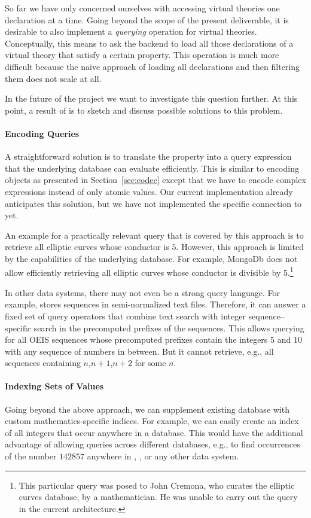 So far we have only concerned ourselves with accessing virtual theories one declaration at a time.
Going beyond the scope of the present deliverable, it is desirable to also implement a \emph{querying} operation for virtual theories.
Conceptually, this means to ask the \MMT backend to load all those declarations of a virtual theory that satisfy a certain property.
This operation is much more difficult because the naive approach of loading all declarations and then filtering them does not scale at all.

In the future of the \pn project we want to investigate this question further.
At this point, a result of \pn is to sketch and discuss possible solutions to this problem.

\paragraph{Encoding Queries}
A straightforward solution is to translate the property into a query expression that the underlying database can evaluate efficiently.
This is similar to encoding objects as presented in Section~\ref{sec:codec} except that we have to encode complex expressions instead of only atomic values.
Our current implementation already anticipates this solution, but we have not implemented the specific connection to \LMFDB yet.

An example for a practically relevant query that is covered by this approach is to retrieve all elliptic curves whose conductor is $5$.
However, this approach is limited by the capabilities of the underlying database.
For example, MongoDb does not allow efficiently retrieving all elliptic curves whose conductor is divisible by $5$.\footnote{This particular query was posed to John Cremona, who curates the elliptic curves database, by a mathematician. He was unable to carry out the query in the current architecture.}

In other data systems, there may not even be a strong query language.
For example, \OEIS stores sequences in semi-normalized text files.
Therefore, it can answer a fixed set of query operators that combine text search with integer sequence--specific search in the precomputed prefixes of the sequences.
This allows querying for all OEIS sequences whose precomputed prefixes contain the integers $5$ and $10$ with any sequence of numbers in between.
But it cannot retrieve, e.g., all sequences containing $n$,$n+1$,$n+2$ for some $n$.

\paragraph{Indexing Sets of Values}
Going beyond the above approach, we can supplement existing database with custom mathematics-specific indices.
For example, we can easily create an index of all integers that occur anywhere in a database.
This would have the additional advantage of allowing queries across different databases, e.g., to find occurrences of the number $142857$ anywhere in \LMFDB, \OEIS, or any other data system.

